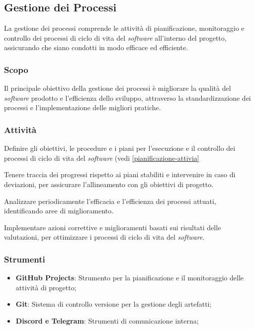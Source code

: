 \subsection{Gestione dei Processi}

La gestione dei processi comprende le attività di pianificazione, monitoraggio
e controllo dei processi di ciclo di vita del \textit{software} all'interno del
progetto, assicurando che siano condotti in modo efficace ed efficiente.

\subsubsection{Scopo}
Il principale obiettivo della gestione dei processi è migliorare la qualità
del \textit{software} prodotto e l'efficienza dello sviluppo, attraverso la
standardizzazione dei processi e l'implementazione delle migliori pratiche.

\subsubsection{Attività}
Definire gli obiettivi, le
	  procedure e i piani per l'esecuzione e il controllo dei processi di
	  ciclo di vita del \textit{software} (vedi
	  \cref{pianificazione-attivia} 



Tenere traccia dei progressi
	  rispetto ai piani stabiliti e intervenire in caso di deviazioni, per
	  assicurare l'allineamento con gli obiettivi di progetto.

Analizzare periodicamente
	  l'efficacia e l'efficienza dei processi attuati, identificando aree di
	  miglioramento.

Implementare azioni correttive e
	  miglioramenti basati sui risultati delle valutazioni, per ottimizzare
	  i processi di ciclo di vita del \textit{software}.



\subsubsection{Strumenti}
\begin{itemize}
	\item \textbf{GitHub Projects}: Strumento per la pianificazione e il
	      monitoraggio delle attività di progetto;

	\item \textbf{Git}: Sistema di controllo versione per la gestione degli
	      artefatti;

	\item \textbf{Discord e Telegram}: Strumenti di comunicazione interna;
\end{itemize}
